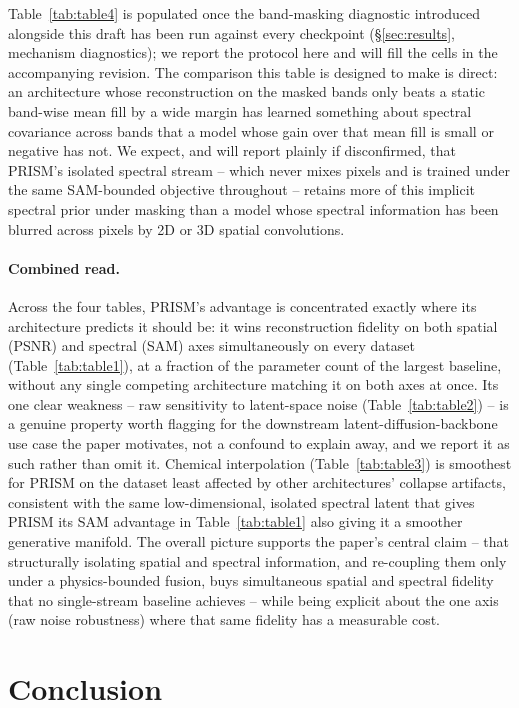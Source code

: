 \documentclass{article} %
\begin{document}
Table~\ref{tab:table4} is populated once the band-masking diagnostic introduced alongside this draft has been run against every checkpoint (\S\ref{sec:results}, mechanism diagnostics); we report the protocol here and will fill the cells in the accompanying revision. The comparison this table is designed to make is direct: an architecture whose reconstruction on the masked bands only beats a static band-wise mean fill by a wide margin has learned something about spectral covariance across bands that a model whose gain over that mean fill is small or negative has not. We expect, and will report plainly if disconfirmed, that PRISM's isolated spectral stream -- which never mixes pixels and is trained under the same SAM-bounded objective throughout -- retains more of this implicit spectral prior under masking than a model whose spectral information has been blurred across pixels by 2D or 3D spatial convolutions.

\paragraph{Combined read.} Across the four tables, PRISM's advantage is concentrated exactly where its architecture predicts it should be: it wins reconstruction fidelity on both spatial (PSNR) and spectral (SAM) axes simultaneously on every dataset (Table~\ref{tab:table1}), at a fraction of the parameter count of the largest baseline, without any single competing architecture matching it on both axes at once. Its one clear weakness -- raw sensitivity to latent-space noise (Table~\ref{tab:table2}) -- is a genuine property worth flagging for the downstream latent-diffusion-backbone use case the paper motivates, not a confound to explain away, and we report it as such rather than omit it. Chemical interpolation (Table~\ref{tab:table3}) is smoothest for PRISM on the dataset least affected by other architectures' collapse artifacts, consistent with the same low-dimensional, isolated spectral latent that gives PRISM its SAM advantage in Table~\ref{tab:table1} also giving it a smoother generative manifold. The overall picture supports the paper's central claim -- that structurally isolating spatial and spectral information, and re-coupling them only under a physics-bounded fusion, buys simultaneous spatial and spectral fidelity that no single-stream baseline achieves -- while being explicit about the one axis (raw noise robustness) where that same fidelity has a measurable cost.

\section{Conclusion}
\end{document}
